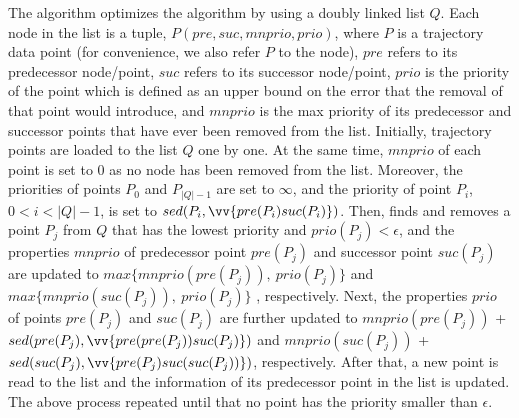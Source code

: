 
The \squishe algorithm optimizes the \tpa algorithm by using a doubly linked list $Q$. Each node in the list is a tuple, \ie $P(pre, suc, mnprio, prio)$, where $P$ is a trajectory data point (for convenience, we also refer $P$ to the node), $pre$ refers to its predecessor node/point, $suc$ refers to its successor node/point, $prio$ is the priority of the point which is defined as an upper bound on the \sed error that the removal of that point would introduce, and $mnprio$ is the max priority of its predecessor and successor points that have ever been removed from the list.
%
Initially, trajectory points are loaded to the list $Q$ one by one.
At the same time, $mnprio$ of each point is set to $0$ as no node has been removed from the list.
Moreover, the priorities of points $P_0$ and $P_{|Q|-1}$ are set to $\infty$, and the priority of point $P_i$, $0<i<|Q|-1$, is set to $sed(P_i, \vv{pre(P_{i})suc(P_{i})})$.
%
Then, \squishe finds and removes a point $P_j$ from $Q$ that has the lowest priority and $prio(P_j)<\epsilon$, and the properties $mnprio$ of predecessor point $pre(P_j)$ and successor point $suc(P_j)$ are updated to $max\{mnprio(pre(P_j)), ~prio(P_j)\}$ and $max\{mnprio(suc(P_j)), ~prio(P_j)\}$ , respectively.
Next, the properties $prio$ of points $pre(P_j)$ and $suc(P_j)$ are further updated to $mnprio(pre(P_j))$ + $sed(pre(P_j), \vv{pre(pre(P_{j}))suc(P_{j})})$ and $mnprio(suc(P_j))$ + $sed(suc(P_j),\vv{pre(P_{j})suc(suc(P_{j}))})$, respectively.
%
After that, a new point is read to the list and the information of its predecessor point in the list is updated.
%
The above process repeated until that no point has the priority smaller than $\epsilon$. %

